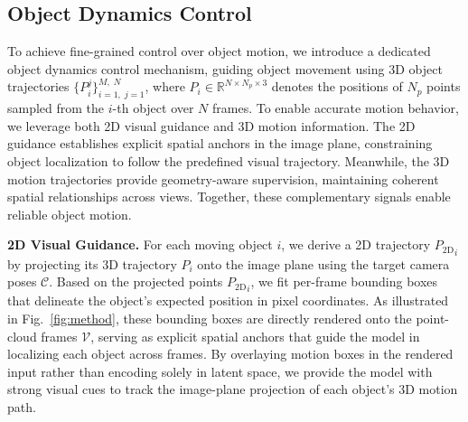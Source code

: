 \subsection{Object Dynamics Control}
\label{sec:OMM}
To achieve fine-grained control over object motion, we introduce a dedicated object dynamics control mechanism, guiding object movement using 3D object trajectories $\{ P_{i}^{j} \}_{i=1,\; j=1}^{M,\; N}$, where $P_i \in \mathbb{R}^{N \times N_p \times 3}$ denotes the positions of $N_p$ points sampled from the $i$-th object over $N$ frames.
To enable accurate motion behavior, we leverage both 2D visual guidance and 3D motion information. 
The 2D guidance establishes explicit spatial anchors in the image plane, 
constraining object localization to follow the predefined visual trajectory.
Meanwhile, the 3D motion trajectories provide geometry-aware supervision, maintaining coherent spatial relationships across views. 
Together, these complementary signals enable reliable object motion.

\vspace{1mm}
\noindent\textbf{2D Visual Guidance.}
For each moving object $i$, we derive a 2D trajectory ${P_{\text{2D}}}_i$ by projecting its 3D trajectory $P_i$ 
onto the image plane using the target camera poses $\mathcal{C}$. 
Based on the projected points ${P_{\text{2D}}}_i$, we fit per-frame bounding boxes that delineate the object’s expected position in pixel coordinates. 
As illustrated in Fig.~\ref{fig:method}, these bounding boxes are directly rendered onto the point-cloud frames $\mathcal{V}$, serving as explicit spatial anchors that guide the model in localizing each object across frames.
By overlaying motion boxes in the rendered input rather than encoding solely in latent space, we provide the model with strong visual cues to track the image-plane projection of each object’s 3D motion path.

